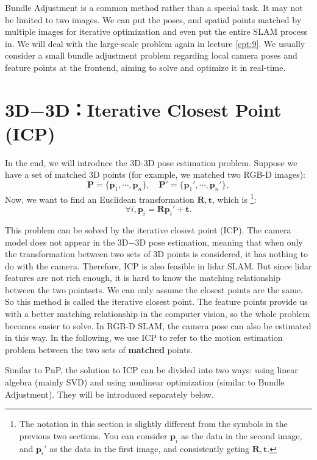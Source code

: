 Bundle Adjustment is a common method rather than a special task. It may not be limited to two images. We can put the poses, and spatial points matched by multiple images for iterative optimization and even put the entire SLAM process in. We will deal with the large-scale problem again in lecture \ref{cpt:9}. We usually consider a small bundle adjustment problem regarding local camera poses and feature points at the frontend, aiming to solve and optimize it in real-time.

\section{3D−3D：Iterative Closest Point (ICP)}
In the end, we will introduce the 3D-3D pose estimation problem. Suppose we have a set of matched 3D points (for example, we matched two RGB-D images):
\[
\mathbf{P} = \{ \mathbf{p}_1, \cdots, \mathbf{p}_n \}, \quad \mathbf{P}' = \{ \mathbf{p}_1', \cdots, \mathbf{p}_n'\},
\]
Now, we want to find an Euclidean transformation $\mathbf{R}, \mathbf{t}$, which is \footnote{The notation in this section is slightly different from the symbols in the previous two sections. You can consider $\mathbf{p}_i$ as the data in the second image, and $\mathbf{p}_i'$ as the data in the first image, and consistently geting $ \mathbf{R},\mathbf{t}$.}:
\[
\forall i, \mathbf{p}_i = \mathbf{R} \mathbf{p}_i' + \mathbf{t}.
\]

This problem can be solved by the iterative closest point (ICP). The camera model does not appear in the 3D−3D pose estimation, meaning that when only the transformation between two sets of 3D points is considered, it has nothing to do with the camera. Therefore, ICP is also feasible in lidar SLAM. But since lidar features are not rich enough, it is hard to know the matching relationship between the two pointsets.  We can only assume the closest points are the same. So this method is called the iterative closest point. The feature points provide us with a better matching relationship in the computer vision, so the whole problem becomes easier to solve. In RGB-D SLAM, the camera pose can also be estimated in this way. In the following, we use ICP to refer to the motion estimation problem between the two sets of \textbf{matched} points.

Similar to PnP, the solution to ICP can be divided into two ways: using linear algebra (mainly SVD) and using nonlinear optimization (similar to Bundle Adjustment). They will be introduced separately below.


